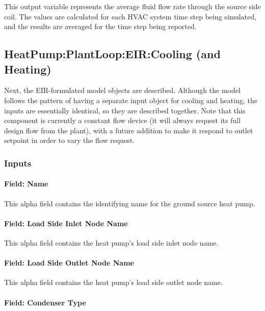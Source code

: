 This output variable represents the average fluid flow rate through the source side coil. The values are calculated for each HVAC system time step being simulated, and the results are averaged for the time step being reported.

\subsection{HeatPump:PlantLoop:EIR:Cooling (and Heating)}\label{plhp_eir}

Next, the EIR-formulated model objects are described. Although the model follows the pattern of having a separate input object for cooling and heating, the inputs are essentially identical, so they are described together.  Note that this component is currently a constant flow device (it will always request its full design flow from the plant), with a future addition to make it respond to outlet setpoint in order to vary the flow request.

\subsubsection{Inputs}\label{plhp_eir_inputs}

\paragraph{Field: Name}\label{plhp_eir_inputs_name}

This alpha field contains the identifying name for the ground source heat pump.

\paragraph{Field: Load Side Inlet Node Name}\label{plhp_eir_inputs_load_inlet_node}

This alpha field contains the heat pump's load side inlet node name.

\paragraph{Field: Load Side Outlet Node Name}\label{plhp_eir_inputs_load_outlet_node}

This alpha field contains the heat pump's load side outlet node name.

\paragraph{Field: Condenser Type}\label{plhp_eir_condenser_type}

